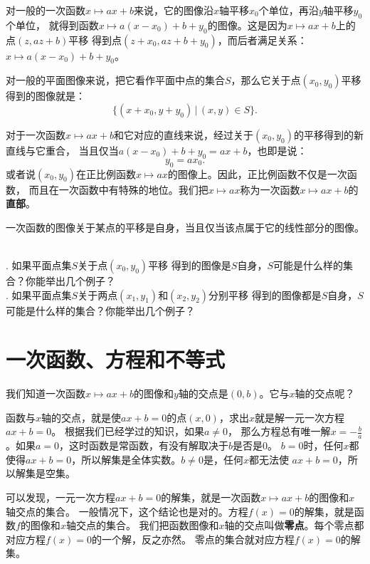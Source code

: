 \documentclass[12pt,UTF8]{ctexbook}
\begin{document}
对一般的一次函数$x\mapsto ax+b$来说，它的图像沿$x$轴平移$x_0$个单位，再沿$y$轴平移$y_0$个单位，
就得到函数$x\mapsto a(x-x_0)+b+y_0$的图像。这是因为$x\mapsto ax+b$上的点$(z, az+b)$平移
得到点$(z+x_0, az+b+y_0)$，而后者满足关系：$x\mapsto a(x-x_0)+b+y_0$。

对一般的平面图像来说，把它看作平面中点的集合$S$，那么它关于点$(x_0, y_0)$平移
得到的图像就是：
$$\{(x+x_0, y+y_0) \,|\, (x,y)\in S \}.$$

对于一次函数$x\mapsto ax+b$和它对应的直线来说，经过关于$(x_0, y_0)$的平移得到的新直线与它重合，
当且仅当$a(x-x_0)+b+y_0 = ax + b$，也即是说：
$$ y_0 = ax_0.$$
或者说$(x_0, y_0)$在正比例函数$x\mapsto ax$的图像上。因此，正比例函数不仅是一次函数，
而且在一次函数中有特殊的地位。我们把$x\mapsto ax$称为一次函数$x\mapsto ax+b$的\textbf{直部}。

\begin{tm}\label{tm:5-2-0}
    一次函数的图像关于某点的平移是自身，当且仅当该点属于它的线性部分的图像。
\end{tm}

\begin{sk}\label{sk:5-2-0}
    \mbox{}\\
    . 如果平面点集$S$关于点$(x_0, y_0)$平移
    得到的图像是$S$自身，$S$可能是什么样的集合？你能举出几个例子？ \\
    . 如果平面点集$S$关于两点$(x_1, y_1)$和$(x_2, y_2)$分别平移
    得到的图像都是$S$自身，$S$可能是什么样的集合？你能举出几个例子？
\end{sk}

\section{一次函数、方程和不等式}
我们知道一次函数$x\mapsto ax + b$的图像和$y$轴的交点是$(0, b)$。它与$x$轴的交点呢？

函数与$x$轴的交点，就是使$ax + b = 0$的点$(x, 0)$，求出$x$就是解一元一次方程$ax + b = 0$。
根据我们已经学过的知识，如果$a\neq 0$，
那么方程总有唯一解$x= -\frac{b}{a}$。如果$a = 0$，这时函数是常函数，有没有解取决于$b$是否是$0$。
$b = 0$时，任何$x$都使得$ax + b = 0$，所以解集是全体实数。$b \neq 0$是，任何$x$都无法使
$ax + b = 0$，所以解集是空集。

可以发现，一元一次方程$ax + b = 0$的解集，就是一次函数$x\mapsto ax + b$的图像和$x$轴交点的集合。
一般情况下，这个结论也是对的。方程$f(x) = 0$的解集，就是函数$f$的图像和$x$轴交点的集合。
我们把函数图像和$x$轴的交点叫做\textbf{零点}。每个零点都对应方程$f(x) = 0$的一个解，反之亦然。
零点的集合就对应方程$f(x) = 0$的解集。
\end{document}
